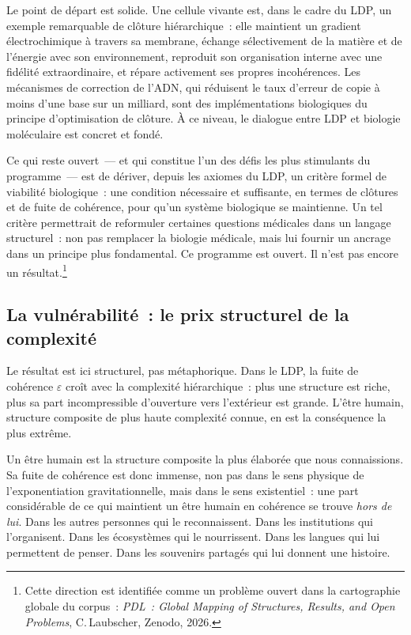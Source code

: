 \documentclass[12pt, a4paper, openright]{book}
\begin{document}
\medskip

Le point de départ est solide. Une cellule vivante est, dans le cadre du LDP, un exemple remarquable de clôture hiérarchique~: elle maintient un gradient électrochimique à travers sa membrane, échange sélectivement de la matière et de l'énergie avec son environnement, reproduit son organisation interne avec une fidélité extraordinaire, et répare activement ses propres incohérences. Les mécanismes de correction de l'ADN, qui réduisent le taux d'erreur de copie à moins d'une base sur un milliard, sont des implémentations biologiques du principe d'optimisation de clôture. À ce niveau, le dialogue entre LDP et biologie moléculaire est concret et fondé.

\medskip

Ce qui reste ouvert~--- et qui constitue l'un des défis les plus stimulants du programme~--- est de dériver, depuis les axiomes du LDP, un critère formel de viabilité biologique~: une condition nécessaire et suffisante, en termes de clôtures et de fuite de cohérence, pour qu'un système biologique se maintienne. Un tel critère permettrait de reformuler certaines questions médicales dans un langage structurel~: non pas remplacer la biologie médicale, mais lui fournir un ancrage dans un principe plus fondamental. Ce programme est ouvert. Il n'est pas encore un résultat.\footnote{Cette direction est identifiée comme un problème ouvert dans la cartographie globale du corpus~: \textit{PDL~: Global Mapping of Structures, Results, and Open Problems}, C.\,Laubscher, Zenodo, 2026.}

\subsection*{La vulnérabilité~: le prix structurel de la complexité}

Le résultat est ici structurel, pas métaphorique. Dans le LDP, la fuite de cohérence $\varepsilon$ croît avec la complexité hiérarchique~: plus une structure est riche, plus sa part incompressible d'ouverture vers l'extérieur est grande. L'être humain, structure composite de plus haute complexité connue, en est la conséquence la plus extrême.

\medskip

Un être humain est la structure composite la plus élaborée que nous connaissions. Sa fuite de cohérence est donc immense, non pas dans le sens physique de l'exponentiation gravitationnelle, mais dans le sens existentiel~: une part considérable de ce qui maintient un être humain en cohérence se trouve \emph{hors de lui}. Dans les autres personnes qui le reconnaissent. Dans les institutions qui l'organisent. Dans les écosystèmes qui le nourrissent. Dans les langues qui lui permettent de penser. Dans les souvenirs partagés qui lui donnent une histoire.
\end{document}
